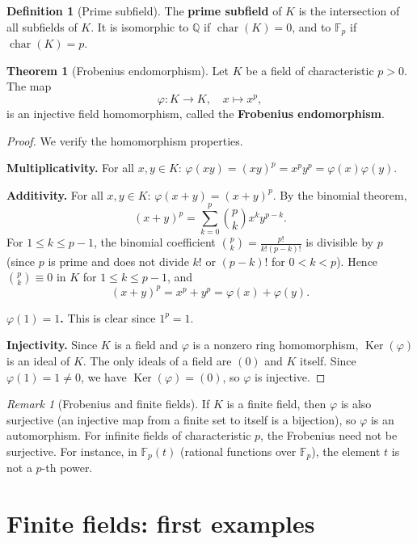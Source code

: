 \documentclass[12pt,a4paper,openany]{book}
\theoremstyle{definition}
\newtheorem{definition}{Definition}[chapter]
\newtheorem{theorem}{Theorem}[chapter]
\theoremstyle{remark}
\newtheorem{remark}{Remark}[chapter]
\newcommand{\Q}{\mathbb{Q}}
\newcommand{\F}{\mathbb{F}}
\DeclareMathOperator{\Ker}{Ker}
\DeclareMathOperator{\chr}{char}
\begin{document}
\begin{definition}[Prime subfield]
\label{def:prime-subfield}
The \textbf{prime subfield} of $K$ is the intersection of all
subfields of $K$. It is isomorphic to $\Q$ if $\chr(K) = 0$, and
to $\F_p$ if $\chr(K) = p$.
\end{definition}

\begin{theorem}[Frobenius endomorphism]
\label{thm:frobenius}
Let $K$ be a field of characteristic $p > 0$. The map
\[
  \varphi \colon K \longrightarrow K, \quad x \longmapsto x^p,
\]
is an injective field homomorphism, called the \textbf{Frobenius
endomorphism}.
\end{theorem}

\begin{proof}
We verify the homomorphism properties.

\textbf{Multiplicativity.} For all $x, y \in K$:
$\varphi(xy) = (xy)^p = x^p y^p = \varphi(x)\varphi(y)$.

\textbf{Additivity.} For all $x, y \in K$:
$\varphi(x + y) = (x+y)^p$. By the binomial theorem,
\[
  (x+y)^p = \sum_{k=0}^{p} \binom{p}{k} x^k y^{p-k}.
\]
For $1 \le k \le p-1$, the binomial coefficient
$\binom{p}{k} = \frac{p!}{k!(p-k)!}$ is divisible by $p$ (since $p$
is prime and does not divide $k!$ or $(p-k)!$ for $0 < k < p$).
Hence $\binom{p}{k} \equiv 0$ in $K$ for $1 \le k \le p-1$, and
\[
  (x+y)^p = x^p + y^p = \varphi(x) + \varphi(y).
\]

\textbf{$\varphi(1) = 1$.} This is clear since $1^p = 1$.

\textbf{Injectivity.} Since $K$ is a field and $\varphi$ is a nonzero
ring homomorphism, $\Ker(\varphi)$ is an ideal of $K$. The only
ideals of a field are $(0)$ and $K$ itself. Since
$\varphi(1) = 1 \ne 0$, we have $\Ker(\varphi) = (0)$, so $\varphi$
is injective.
\end{proof}

\begin{remark}[Frobenius and finite fields]
\label{rem:frobenius-finite}
If $K$ is a finite field, then $\varphi$ is also surjective (an
injective map from a finite set to itself is a bijection), so
$\varphi$ is an automorphism. For infinite fields of characteristic
$p$, the Frobenius need not be surjective. For instance, in
$\F_p(t)$ (rational functions over $\F_p$), the element $t$ is not
a $p$-th power.
\end{remark}

\section{Finite fields: first examples}
\label{sec:finite-fields-intro}
\end{document}

